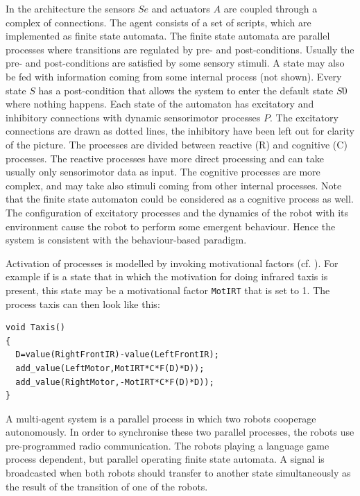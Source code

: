 In the architecture the sensors $Se$ and actuators $A$ are coupled through a complex of connections. The agent consists of a set of scripts, which are implemented as finite state automata. The finite state automata are parallel processes where transitions are regulated by pre- and post-conditions. Usually the pre- and post-conditions are satisfied by some sensory stimuli. A state may also be fed with information coming from some internal process (not shown). Every state $S$ has a post-condition that allows the system to enter the default state $S0$ where nothing happens. Each state of the automaton has excitatory and inhibitory connections with dynamic sensorimotor processes $P$. The excitatory connections are drawn as dotted lines, the inhibitory have been left out for clarity of the picture. The processes are divided between reactive (R) and cognitive (C) processes. The reactive processes have more direct processing and can take usually only sensorimotor data as input. The cognitive processes are more complex, and may take also stimuli coming from other internal processes. Note that the finite state automaton could be considered as a cognitive process as well. The configuration of excitatory processes and the dynamics of the robot with its environment cause the robot to perform some emergent behaviour. Hence the system is consistent with the behaviour-based paradigm.

Activation of processes is modelled by invoking motivational factors (cf. \citealt{steels:1996d,jaeger:1997}). For example if is a state that in which the motivation for doing infrared taxis is present, this state may be a motivational factor \texttt{MotIRT} that is set to 1. The process taxis can then look like this:

{\footnotesize\begin{verbatim}
void Taxis()
{
  D=value(RightFrontIR)-value(LeftFrontIR);
  add_value(LeftMotor,MotIRT*C*F(D)*D));
  add_value(RightMotor,-MotIRT*C*F(D)*D));
}
\end{verbatim}}


A multi-agent system is a parallel process in which two robots cooperage autonomously. In order to synchronise these two parallel processes, the robots use pre-programmed radio communication. The robots playing a language game process dependent, but parallel operating finite state automata. A signal is broadcasted when both robots should transfer to another state simultaneously as the result of the transition of one of the robots.

